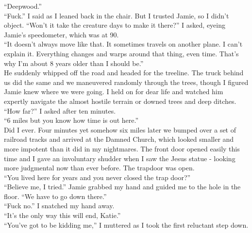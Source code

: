\documentclass[a5paper]{scrartcl}
\begin{document}
\enquote{Deepwood.}\\


\enquote{Fuck.} I said as I leaned back in the chair. But I trusted Jamie, so I didn't object.  \enquote{Won't it take the creature days to make it there?} I asked, eyeing Jamie's speedometer, which was at 90. \\


\enquote{It doesn't always move like that. It sometimes travels on another plane. I can't explain it. Everything changes and warps around that thing, even time. That's why I'm about 8 years older than I should be.}\\


He suddenly whipped off the road and headed for the treeline. The truck behind us did the same and we maneuvered randomly through the trees, though I figured Jamie knew where we were going. I held on for dear life and watched him expertly navigate the almost hostile terrain or downed trees and deep ditches. \\


\enquote{How far?} I asked after ten minutes.\\


\enquote{6 miles but you know how time is out here.} \\


Did I ever. Four minutes yet somehow six miles later we bumped over a set of railroad tracks and arrived at the Damned Church, which looked smaller and more impotent than it did in my nightmares. The front door opened easily this time and I gave an involuntary shudder when I saw the Jesus statue - looking more judgmental now than ever before. The trapdoor was open.\\


\enquote{You lived here for years and you never closed the trap door?} \\


\enquote{Believe me, I tried.} Jamie grabbed my hand and guided me to the hole in the floor. \enquote{We have to go down there.}\\


\enquote{Fuck no.} I snatched my hand away.\\


\enquote{It's the only way this will end, Katie.}\\


\enquote{You've got to be kidding me,} I muttered as I took the first reluctant step down.\\
\end{document}
